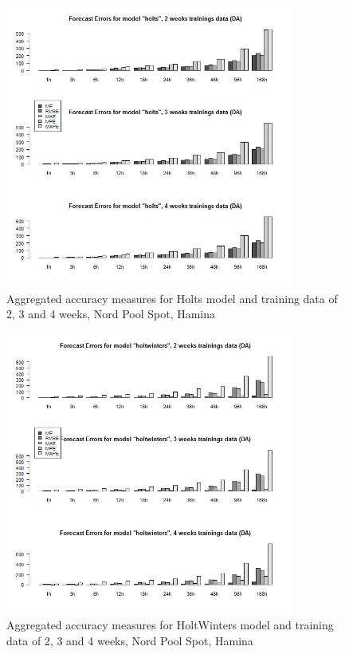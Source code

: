 \begin{figure}[!ht]
	\centering
		\includegraphics[width=0.85\textwidth]{figures/appendix_forecast_results/da_sim_1_x_1w_1w_holts.png}
	\caption{Aggregated accuracy measures for Holts model and training data of 2, 3 and 4 weeks, Nord
Pool Spot, Hamina}
	\label{fig:app_da_sim_1_x_1w_1w_holts}
	\vspace*{-1.6in}
\end{figure}




\begin{figure}[!ht]
	\centering
	\vspace*{-1.2in}
		\includegraphics[width=0.85\textwidth]{figures/appendix_forecast_results/da_sim_1_x_1w_1w_holtwinters.png}
	\caption{Aggregated accuracy measures for HoltWinters model and training data of 2, 3 and 4 weeks, Nord
Pool Spot, Hamina}
	\label{fig:app_da_sim_1_x_1w_1w_holtwinters}
\end{figure}

